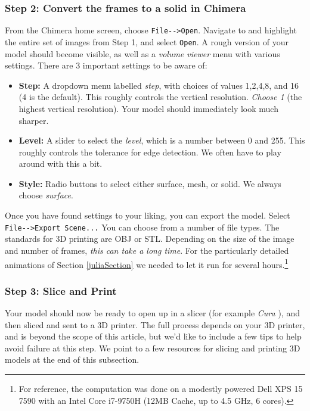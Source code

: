 \documentclass[12 pt]{article}
\begin{document}
\subsubsection*{Step 2: Convert the frames to a solid in Chimera}
From the Chimera home screen, choose \verb|File-->Open|.  Navigate to and highlight the entire set of images from Step 1, and select \verb|Open|.  A rough version of your model should become visible, as well as a \textit{volume viewer} menu with various settings.  There are 3 important settings to be aware of:
\begin{itemize}
    \item \textbf{Step:} A dropdown menu labelled \textit{step}, with choices of values 1,2,4,8, and 16 (4 is the default).  This roughly controls the vertical resolution.  \textit{Choose 1} (the highest vertical resolution).  Your model should immediately look much sharper.
    \item \textbf{Level:} A slider to select the \textit{level}, which is a number between 0 and 255.  This roughly controls the tolerance for edge detection.  We often have to play around with this a bit.
    \item \textbf{Style:} Radio buttons to select either surface, mesh, or solid.  We always choose \textit{surface}.
\end{itemize}
Once you have found settings to your liking, you can export the model.  Select \verb|File-->Export Scene...|  You can choose from a number of file types.  The standards for 3D printing are OBJ or STL.  Depending on the size of the image and number of frames, \textit{this can take a long time}.  For the particularly detailed animations of Section \ref{juliaSection} we needed to let it run for several hours.\footnote{For reference, the computation was done on a modestly powered Dell XPS 15 7590 with an Intel Core i7-9750H (12MB Cache, up to 4.5 GHz, 6 cores).}

\subsubsection*{Step 3: Slice and Print}
Your model should now be ready to open up in a slicer (for example \textit{Cura} \cite{Cura}), and then sliced and sent to a 3D printer.  The full process depends on your 3D printer, and is beyond the scope of this article, but we'd like to include a few tips to help avoid failure at this step.  We point to a few resources for slicing and printing 3D models at the end of this subsection.\\
\end{document}
